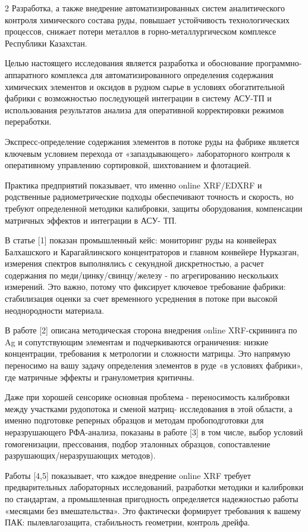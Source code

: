\begin{multicols}{2}
Разработка, а также внедрение автоматизированных систем аналитического
контроля химического состава руды, повышает устойчивость технологических
процессов, снижает потери металлов в горно-металлургическом комплексе
Республики Казахстан.

Целью настоящего исследования является разработка и обоснование
программно-аппаратного комплекса для автоматизированного определения
содержания химических элементов и оксидов в рудном сырье в условиях
обогатительной фабрики с возможностью последующей интеграции в систему
АСУ-ТП и использования результатов анализа для оперативной корректировки
режимов переработки.

Экспресс-определение содержания элементов в потоке руды на фабрике
является ключевым условием перехода от «запаздывающего» лабораторного
контроля к оперативному управлению сортировкой, шихтованием и флотацией.

Практика предприятий показывает, что именно online XRF/EDXRF и
родственные радиометрические подходы обеспечивают точность и скорость,
но требуют определенной методики калибровки, защиты оборудования,
компенсации матричных эффектов и интеграции в АСУ- ТП.

В статье {[}1{]} показан промышленный кейс: мониторинг руды на
конвейерах Балхашского и Карагайлинского концентраторов и главном
конвейере Нурказган, измерения спектров выполнялись с секундной
дискретностью, а расчет содержания по меди/цинку/свинцу/железу - по
агрегированию нескольких измерений. Это важно, потому что фиксирует
ключевое требование фабрики: стабилизация оценки за счет временного
усреднения в потоке при высокой неоднородности материала.

В работе {[}2{]} описана методическая сторона внедрения online
XRF-скрининга по Ag и сопутствующим элементам и подчеркиваются
ограничения: низкие концентрации, требования к метрологии и сложности
матрицы. Это напрямую переносимо на вашу задачу определения элементов в
руде «в условиях фабрики», где матричные эффекты и гранулометрия
критичны.

Даже при хорошей сенсорике основная проблема - переносимость калибровки
между участками рудопотока и сменой матриц- исследования в этой области,
а именно подготовке реперных образцов и методам пробоподготовки для
неразрушающего РФА-анализа, показаны в работе {[}3{]} в том числе, выбор
условий гомогенизации, прессования, подбор эталонных образцов,
сопоставление разрушающих/неразрушающих методов).

Работы {[}4,5{]} показывает, что каждое внедрение online XRF требует
предварительных лабораторных исследований, разработки методики и
калибровки по стандартам, а промышленная пригодность определяется
надежностью работы «месяцами без вмешательства». Это фактически
формирует требования к вашему ПАК: пылевлагозащита, стабильность
геометрии, контроль дрейфа.


\end{multicols}
